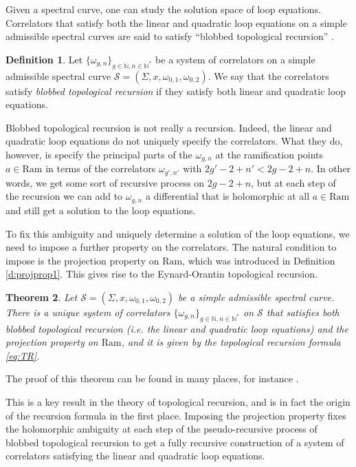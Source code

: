 \documentclass[reqno,oneside,11pt]{amsart}
\theoremstyle{plain}
\newtheorem{theorem}{Theorem}[section]
\theoremstyle{definition}
\newtheorem{definition}[theorem]{Definition}
\theoremstyle{remark}
\numberwithin{equation}{section}
\newcommand{\Ra}{\text{Ram}}
\begin{document}
Given a spectral curve, one can study the solution space of loop equations. Correlators that satisfy both the linear and quadratic loop equations on a simple admissible spectral curves are said to satisfy ``blobbed topological recursion'' \cite{BS15}.

\begin{definition}\label{d:blobbed}
Let $\{\omega_{g,n} \}_{g \in \mathbb{N}, n \in \mathbb{N}^* }$ be a system of correlators on a simple admissible spectral curve $\mathcal{S} = (\Sigma,x,\omega_{0,1}, \omega_{0,2})$. We say that the correlators satisfy \emph{blobbed topological recursion} if they satisfy both linear and quadratic loop equations.
\end{definition}

Blobbed topological recursion is not really a recursion. Indeed, the linear and quadratic loop equations do not uniquely specify the correlators. What they do, however, is specify the principal parts of the $\omega_{g,n}$ at the ramification points $a \in \Ra$ in terms of the correlators $\omega_{g',n'}$ with $2g'-2+n' < 2g-2+n$. In other words, we get some sort of recursive process on $2g-2+n$, but at each step of the recursion we can add to $\omega_{g,n}$ a differential that is holomorphic at all $a \in \Ra$ and still get a solution to the loop equations.

To fix this ambiguity and uniquely determine a solution of the loop equations, we need to impose a further property on the correlators. The natural condition to impose is the projection property on $\Ra$, which was introduced in Definition \ref{d:projprop1}. This gives rise to the Eynard-Orantin topological recursion.

\begin{theorem}\label{d:unique}
Let $\mathcal{S} = (\Sigma,x,\omega_{0,1}, \omega_{0,2})$ be a simple admissible spectral curve. There is a unique system of correlators $\{\omega_{g,n} \}_{g \in \mathbb{N}, n \in \mathbb{N}^* }$ on $\mathcal{S}$ that satisfies both blobbed topological recursion (i.e. the linear and quadratic loop equations) and the projection property on $\Ra$, and it is given by the topological recursion formula \eqref{eq:TR}.
\end{theorem}

The proof of this theorem can be found in many places, for instance  \cite{BS15,BBCKS23}.

This is a key result in the theory of topological recursion, and is in fact the origin of the recursion formula in the first place. Imposing the projection property fixes the holomorphic ambiguity at each step of the pseudo-recursive process of blobbed topological recursion to get a fully recursive construction of a system of correlators satisfying the linear and quadratic loop equations.
\end{document}
